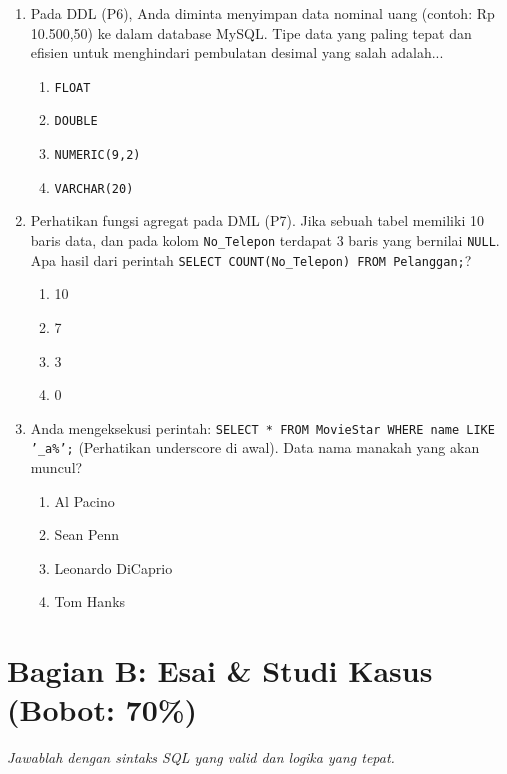 \documentclass[11pt,a4paper]{article}
\begin{document}
\begin{enumerate}
	\item Pada DDL (P6), Anda diminta menyimpan data nominal uang (contoh: Rp 10.500,50) ke dalam database MySQL. Tipe data yang paling tepat dan efisien untuk menghindari pembulatan desimal yang salah adalah...
	      \begin{enumerate}[label=\Alph*.]
		      \item \texttt{FLOAT}
		      \item \texttt{DOUBLE}
		      \item \texttt{NUMERIC(9,2)}
		      \item \texttt{VARCHAR(20)}
	      \end{enumerate}

	\item Perhatikan fungsi agregat pada DML (P7). Jika sebuah tabel memiliki 10 baris data, dan pada kolom \texttt{No\_Telepon} terdapat 3 baris yang bernilai \texttt{NULL}. Apa hasil dari perintah \texttt{SELECT COUNT(No\_Telepon) FROM Pelanggan;}?
	      \begin{enumerate}[label=\Alph*.]
		      \item 10
		      \item 7
		      \item 3
		      \item 0
	      \end{enumerate}

	\item Anda mengeksekusi perintah: \texttt{SELECT * FROM MovieStar WHERE name LIKE '\_a\%';} (Perhatikan underscore di awal). Data nama manakah yang akan muncul?
	      \begin{enumerate}[label=\Alph*.]
		      \item Al Pacino
		      \item Sean Penn
		      \item Leonardo DiCaprio
		      \item Tom Hanks
	      \end{enumerate}
\end{enumerate}

\section*{Bagian B: Esai \& Studi Kasus (Bobot: 70\%)}
\textit{Jawablah dengan sintaks SQL yang valid dan logika yang tepat.}
\end{document}
